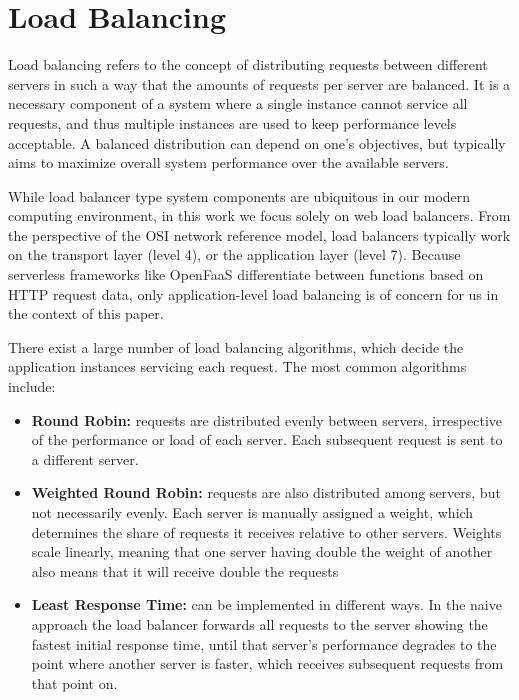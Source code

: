 \section{Load Balancing}
Load balancing refers to the concept of distributing requests between different servers in such a way that the amounts of requests per server are balanced.
It is a necessary component of a system where a single instance cannot service all requests, and thus multiple instances are used to keep performance levels acceptable.
A balanced distribution can depend on one's objectives, but typically aims to maximize overall system performance over the available servers\cite{cardelliniDynamicLoadBalancing1999a}.

While load balancer type system components are ubiquitous in our modern computing environment, in this work we focus solely on web load balancers.
From the perspective of the OSI network reference model\cite{dayOSIReferenceModel1983}, load balancers typically work on the transport layer (level 4), or the application layer (level 7).
Because serverless frameworks like OpenFaaS differentiate between functions based on HTTP request data, only application-level load balancing is of concern for us in the context of this paper.

There exist a large number of load balancing algorithms, which decide the application instances servicing each request.
The most common algorithms include:
\begin{itemize}
    \item \textbf{Round Robin:} requests are distributed evenly between servers, irrespective of the performance or load of each server. Each subsequent request is sent to a different server.
    \item \textbf{Weighted Round Robin:} requests are also distributed among servers, but not necessarily evenly. Each server is manually assigned a weight, which determines the share of requests it receives relative to other servers. Weights scale linearly, meaning that one server having double the weight of another also means that it will receive double the requests
    \item \textbf{Least Response Time:} can be implemented in different ways. In the naive approach the load balancer forwards all requests to the server showing the fastest initial response time, until that server's performance degrades to the point where another server is faster, which receives subsequent requests from that point on.
\end{itemize}

